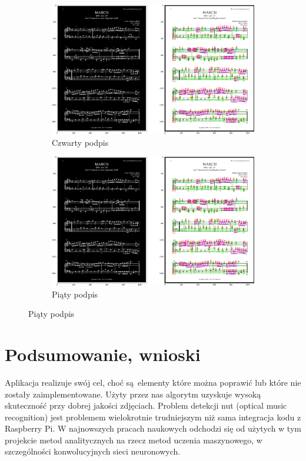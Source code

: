 \documentclass[12pt]{article}
\begin{document}
\begin{figure}[h!]
	\begin{subfigure}[b]{0.48\linewidth}
		\includegraphics[width=\linewidth]{Zdj0.png}
		\caption{Czwarty podpis}
	\end{subfigure}
	\begin{subfigure}[b]{0.48\linewidth}
		\includegraphics[width=\linewidth]{Zdj0.png}
		\caption{Piąty podpis}
	\end{subfigure}
\end{figure}

\section{Podsumowanie, wnioski}
Aplikacja realizuje swój cel, choć są elementy które można poprawić lub które nie zostały zaimplementowane. Użyty przez nas algorytm uzyskuje wysoką skuteczność przy dobrej jakości zdjęciach. Problem detekcji nut (optical music recognition) jest problemem wielokrotnie trudniejszym niż sama integracja kodu z Raspberry Pi. W najnowszych pracach naukowych odchodzi się od użytych w tym projekcie metod analitycznych na rzecz metod uczenia maszynowego, w szczególności konwolucyjnych sieci neuronowych.
\end{document}
